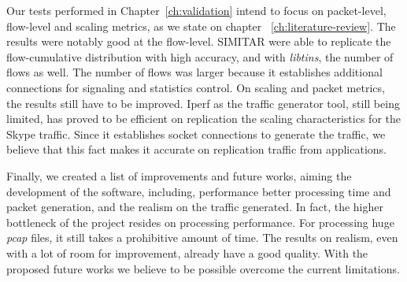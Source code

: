 Our tests performed in Chapter~\ref{ch:validation} intend to focus on packet-level, flow-level and scaling metrics, as we state on chapter ~\ref{ch:literature-review}. The results were notably good at the flow-level. SIMITAR were able to replicate the flow-cumulative distribution with high accuracy, and with \textit{libtins}, the number of flows as well. The number of flows was larger because it establishes additional connections for signaling and statistics control. On scaling and packet metrics, the results still have to be improved. Iperf as the traffic generator tool, still being limited, has proved to be efficient on replication the scaling characteristics for the Skype traffic. Since it establishes socket connections to generate the traffic, we believe that this fact makes it accurate on replication traffic from applications. 


Finally, we created a list of improvements and future works, aiming the development of the software, including, performance better processing time and packet generation, and the realism on the traffic generated. In fact, the higher bottleneck of the project resides on processing performance. For processing huge \textit{pcap} files, it still takes a prohibitive amount of time. The results on realism, even with a lot of room for improvement, already have a good quality. With the proposed future works we believe to be possible overcome the current limitations.



